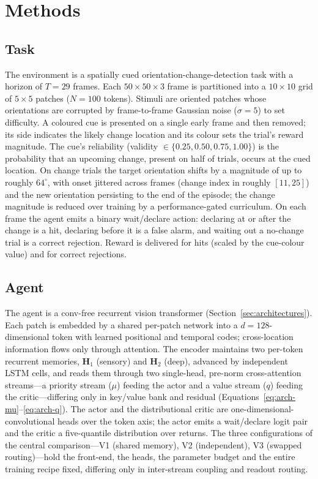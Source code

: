 \section{Methods}
\label{sec:methods}

\subsection{Task}
The environment is a spatially cued orientation-change-detection task with a horizon of $T=29$ frames. Each $50\times50\times3$ frame is partitioned into a $10\times10$ grid of $5\times5$ patches ($N=100$ tokens). Stimuli are oriented patches whose orientations are corrupted by frame-to-frame Gaussian noise ($\sigma=5$) to set difficulty. A coloured cue is presented on a single early frame and then removed; its side indicates the likely change location and its colour sets the trial's reward magnitude. The cue's reliability (validity $\in\{0.25,0.50,0.75,1.00\}$) is the probability that an upcoming change, present on half of trials, occurs at the cued location. On change trials the target orientation shifts by a magnitude of up to roughly $64^{\circ}$, with onset jittered across frames (change index in roughly $[11,25]$) and the new orientation persisting to the end of the episode; the change magnitude is reduced over training by a performance-gated curriculum. On each frame the agent emits a binary wait/declare action: declaring at or after the change is a hit, declaring before it is a false alarm, and waiting out a no-change trial is a correct rejection. Reward is delivered for hits (scaled by the cue-colour value) and for correct rejections.

\subsection{Agent}
The agent is a conv-free recurrent vision transformer (Section~\ref{sec:architectures}). Each patch is embedded by a shared per-patch network into a $d=128$-dimensional token with learned positional and temporal codes; cross-location information flows only through attention. The encoder maintains two per-token recurrent memories, $\mathbf{H}_1$ (sensory) and $\mathbf{H}_2$ (deep), advanced by independent LSTM cells, and reads them through two single-head, pre-norm cross-attention streams---a priority stream ($\mu$) feeding the actor and a value stream ($q$) feeding the critic---differing only in key/value bank and residual (Equations~\eqref{eq:arch-mu}--\eqref{eq:arch-q}). The actor and the distributional critic are one-dimensional-convolutional heads over the token axis; the actor emits a wait/declare logit pair and the critic a five-quantile distribution over returns. The three configurations of the central comparison---V1 (shared memory), V2 (independent), V3 (swapped routing)---hold the front-end, the heads, the parameter budget and the entire training recipe fixed, differing only in inter-stream coupling and readout routing.

